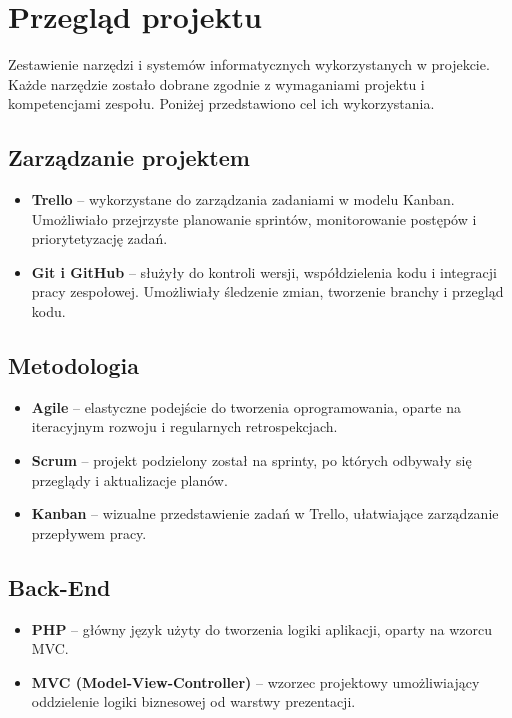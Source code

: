 \documentclass[12pt,a4paper]{article}
\begin{document}
\section{Przegląd projektu}
Zestawienie narzędzi i systemów informatycznych wykorzystanych w projekcie. Każde narzędzie zostało dobrane zgodnie z wymaganiami projektu i kompetencjami zespołu. Poniżej przedstawiono cel ich wykorzystania.

\subsection{Zarządzanie projektem}
\begin{itemize}
    \item \textbf{Trello} – wykorzystane do zarządzania zadaniami w modelu Kanban. Umożliwiało przejrzyste planowanie sprintów, monitorowanie postępów i priorytetyzację zadań.
    \item \textbf{Git i GitHub} – służyły do kontroli wersji, współdzielenia kodu i integracji pracy zespołowej. Umożliwiały śledzenie zmian, tworzenie branchy i przegląd kodu.
\end{itemize}

\subsection{Metodologia}
\begin{itemize}
    \item \textbf{Agile} – elastyczne podejście do tworzenia oprogramowania, oparte na iteracyjnym rozwoju i regularnych retrospekcjach.
    \item \textbf{Scrum} – projekt podzielony został na sprinty, po których odbywały się przeglądy i aktualizacje planów.
    \item \textbf{Kanban} – wizualne przedstawienie zadań w Trello, ułatwiające zarządzanie przepływem pracy.
\end{itemize}

\subsection{Back-End}
\begin{itemize}
    \item \textbf{PHP} – główny język użyty do tworzenia logiki aplikacji, oparty na wzorcu MVC.
    \item \textbf{MVC (Model-View-Controller)} – wzorzec projektowy umożliwiający oddzielenie logiki biznesowej od warstwy prezentacji.
\end{itemize}
\end{document}
